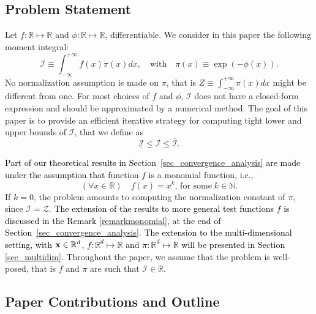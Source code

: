 \documentclass[review]{elsarticle}
\newcommand{\cblue}{\textcolor{black}}
\newcommand{\Ic}{\mathcal{I}}
\def\x{{\bf x}}
\begin{document}
\subsection{Problem Statement}

Let $f: \mathbb{R} \mapsto \mathbb{R}$ and $\phi: \mathbb{R} \mapsto \mathbb{R}$, differentiable. We consider in this paper the following moment integral:
\begin{equation}
\label{integral_interest}
\Ic \equiv \int_{-\infty}^{+\infty} f(x) \pi(x) dx, \quad \text{with} \quad \pi(x) \equiv \exp(-\phi(x)).
\end{equation}
No normalization assumption is made on $\pi$, that is $Z \equiv \int_{-\infty}^{+\infty} \pi(x) dx$ might be different from one. For most choices of $f$ and $\phi$, $\Ic$ does not have a closed-form expression and should be approximated by a numerical method. The goal of this paper is to provide an efficient iterative strategy for computing tight lower and upper bounds of $\Ic$, that we define as
\begin{equation}
\underline{\Ic} \leq \Ic \leq \overline{\Ic}. \label{eq:boundsgene}
\end{equation}

\cblue{Part of our theoretical results in Section~\ref{sec_convergence_analysis} are made under the assumption that}
function $f$ is a monomial function, i.e., 
\begin{equation}
    (\forall x \in \mathbb{R}) \quad f(x) = x^k, \, \text{for some} \; k \in  \mathbb{N}. \label{eq:monomial}
\end{equation}
If $k=0$, the problem amounts to computing the normalization constant of $\pi$, since $\mathcal{I} = \mathcal{Z}$. \cblue{The extension of the results to more general test functions $f$ is discussed in the Remark \ref{remarkmonomial}, at the end of Section~\ref{sec_convergence_analysis}}. \cblue{The extension to the multi-dimensional setting, with $\x \in \mathbb{R}^d$, $f: \mathbb{R}^d \mapsto \mathbb{R}$ and $\pi: \mathbb{R}^d \mapsto \mathbb{R}$ will be presented in Section \ref{sec_multidim}.} Throughout the paper, we assume that the problem is well-posed, that is $f$ and $\pi$ are such that $\mathcal{I} \in \mathbb{R}$. 

\subsection{Paper Contributions and Outline}
\end{document}
